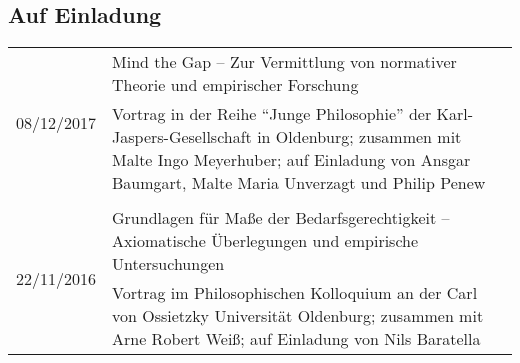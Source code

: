 \documentclass[a4paper,10pt]{article}
\begin{document}
\subsection*{Auf Einladung}
\begin{longtable}{p{}p{}}
\multirow{2}{1,75cm}{\footnotesize{08/12/2017}} & Mind the Gap -- Zur Vermittlung von normativer Theorie und empirischer Forschung\\
& \footnotesize{Vortrag in der Reihe \enquote{Junge Philosophie} der Karl-Jaspers-Gesellschaft in Oldenburg; zusammen mit Malte Ingo Meyerhuber; auf Einladung von Ansgar Baumgart, Malte Maria Unverzagt und Philip Penew}\\
\\
\multirow{2}{1,75cm}{\footnotesize{22/11/2016}} & Grundlagen für Maße der Bedarfsgerechtigkeit -- Axiomatische Überlegungen und empirische Untersuchungen\\
& \footnotesize{Vortrag im Philosophischen Kolloquium an der Carl von Ossietzky Universität Oldenburg; zusammen mit Arne Robert Weiß; auf Einladung von Nils Baratella}\\
\end{longtable}
\end{document}
